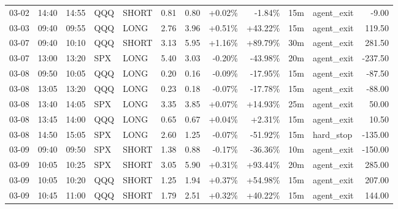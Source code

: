 \documentclass[11pt,a4paper]{article}
\begin{document}
\begin{center}
\begin{longtable}{>{\color{txtmain}}l l l l l r r r r r >{\color{txtmain}}l r}
03-02 & 14:40 & 14:55 & QQQ & SHORT & 0.81 & 0.80 & \textcolor{wingreen}{+0.02\%} & \textcolor{lossred}{-1.84\%} & 15m & agent\_exit & \textcolor{lossred}{-9.00} \\
03-03 & 09:40 & 09:55 & QQQ & LONG & 2.76 & 3.96 & \textcolor{wingreen}{+0.51\%} & \textcolor{wingreen}{+43.22\%} & 15m & agent\_exit & \textcolor{wingreen}{119.50} \\
03-07 & 09:40 & 10:10 & QQQ & SHORT & 3.13 & 5.95 & \textcolor{wingreen}{+1.16\%} & \textcolor{wingreen}{+89.79\%} & 30m & agent\_exit & \textcolor{wingreen}{281.50} \\
03-07 & 13:00 & 13:20 & SPX & LONG & 5.40 & 3.03 & \textcolor{lossred}{-0.20\%} & \textcolor{lossred}{-43.98\%} & 20m & agent\_exit & \textcolor{lossred}{-237.50} \\
03-08 & 09:50 & 10:05 & QQQ & LONG & 0.20 & 0.16 & \textcolor{lossred}{-0.09\%} & \textcolor{lossred}{-17.95\%} & 15m & agent\_exit & \textcolor{lossred}{-87.50} \\
03-08 & 13:05 & 13:20 & QQQ & LONG & 0.23 & 0.18 & \textcolor{lossred}{-0.07\%} & \textcolor{lossred}{-17.78\%} & 15m & agent\_exit & \textcolor{lossred}{-88.00} \\
03-08 & 13:40 & 14:05 & SPX & LONG & 3.35 & 3.85 & \textcolor{wingreen}{+0.07\%} & \textcolor{wingreen}{+14.93\%} & 25m & agent\_exit & \textcolor{wingreen}{50.00} \\
03-08 & 13:45 & 14:00 & QQQ & LONG & 0.65 & 0.67 & \textcolor{wingreen}{+0.04\%} & \textcolor{wingreen}{+2.31\%} & 15m & agent\_exit & \textcolor{wingreen}{10.50} \\
03-08 & 14:50 & 15:05 & SPX & LONG & 2.60 & 1.25 & \textcolor{lossred}{-0.07\%} & \textcolor{lossred}{-51.92\%} & 15m & hard\_stop & \textcolor{lossred}{-135.00} \\
03-09 & 09:40 & 09:50 & SPX & SHORT & 1.38 & 0.88 & \textcolor{lossred}{-0.17\%} & \textcolor{lossred}{-36.36\%} & 10m & agent\_exit & \textcolor{lossred}{-150.00} \\
03-09 & 10:05 & 10:25 & SPX & SHORT & 3.05 & 5.90 & \textcolor{wingreen}{+0.31\%} & \textcolor{wingreen}{+93.44\%} & 20m & agent\_exit & \textcolor{wingreen}{285.00} \\
03-09 & 10:05 & 10:20 & QQQ & SHORT & 1.25 & 1.94 & \textcolor{wingreen}{+0.37\%} & \textcolor{wingreen}{+54.98\%} & 15m & agent\_exit & \textcolor{wingreen}{207.00} \\
03-09 & 10:45 & 11:00 & QQQ & SHORT & 1.79 & 2.51 & \textcolor{wingreen}{+0.32\%} & \textcolor{wingreen}{+40.22\%} & 15m & agent\_exit & \textcolor{wingreen}{144.00} \\

\end{longtable}
\end{center}
\end{document}
